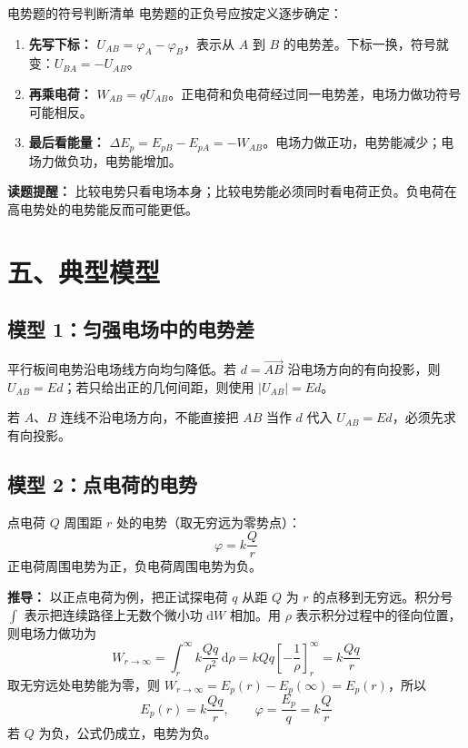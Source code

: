\begin{learningbox}{电势题的符号判断清单}
电势题的正负号应按定义逐步确定：
\begin{enumerate}
  \item \textbf{先写下标：} $U_{AB}=\varphi_A-\varphi_B$，表示从 $A$ 到 $B$ 的电势差。下标一换，符号就变：$U_{BA}=-U_{AB}$。
  \item \textbf{再乘电荷：} $W_{AB}=qU_{AB}$。正电荷和负电荷经过同一电势差，电场力做功符号可能相反。
  \item \textbf{最后看能量：} $\Delta E_p=E_{pB}-E_{pA}=-W_{AB}$。电场力做正功，电势能减少；电场力做负功，电势能增加。
\end{enumerate}
\textbf{读题提醒：} 比较电势只看电场本身；比较电势能必须同时看电荷正负。负电荷在高电势处的电势能反而可能更低。
\end{learningbox}

\section*{五、典型模型}

\subsection*{模型 1：匀强电场中的电势差}

平行板间电势沿电场线方向均匀降低。若
$d=\overrightarrow{AB}$ 沿电场方向的有向投影，则
$U_{AB}=Ed$；若只给出正的几何间距，则使用 $|U_{AB}|=Ed$。

\begin{center}


\label{fig:uniform-field-potential-gradient}
\end{center}

若 $A$、$B$ 连线不沿电场方向，不能直接把 $AB$ 当作
$d$ 代入 $U_{AB}=Ed$，必须先求有向投影。

\subsection*{模型 2：点电荷的电势}

点电荷 $Q$ 周围距 $r$ 处的电势（取无穷远为零势点）：
\[
\varphi = k\frac{Q}{r}
\]
正电荷周围电势为正，负电荷周围电势为负。

\textbf{推导：} 以正点电荷为例，把正试探电荷 $q$ 从距 $Q$ 为 $r$ 的点移到无穷远。积分号
$\int$ 表示把连续路径上无数个微小功 $\mathrm dW$ 相加。用
$\rho$ 表示积分过程中的径向位置，则电场力做功为
\[
W_{r\to\infty}=\int_r^\infty k\frac{Qq}{\rho^2}\,\mathrm{d}\rho
=kQq\left[-\frac{1}{\rho}\right]_r^\infty
=k\frac{Qq}{r}
\]
取无穷远处电势能为零，则 $W_{r\to\infty}=E_p(r)-E_p(\infty)=E_p(r)$，所以
\[
E_p(r)=k\frac{Qq}{r},\qquad
\varphi=\frac{E_p}{q}=k\frac{Q}{r}
\]
若 $Q$ 为负，公式仍成立，电势为负。

